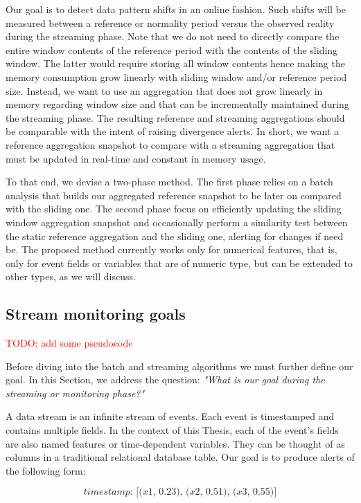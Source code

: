 Our goal is to detect data pattern shifts in an online fashion. Such shifts will be measured between a reference or normality period versus the observed reality during the streaming phase. Note that we do not need to directly compare the entire window contents of the reference period with the contents of the sliding window. The latter would require storing all window contents hence making the memory consumption grow linearly with sliding window and/or reference period size. Instead, we want to use an aggregation that does not grow linearly in memory regarding window size and that can be incrementally maintained during the streaming phase. The resulting reference and streaming aggregations should be comparable with the intent of raising divergence alerts. In short, we want a reference aggregation snapshot to compare with a streaming aggregation that must be updated in real-time and constant in memory usage.

To that end, we devise a two-phase method. The first phase relies on a batch analysis that builds our aggregated reference snapshot to be later on compared with the sliding one. The second phase focus on efficiently updating the sliding window aggregation snapshot and occasionally perform a similarity test between the static reference aggregation and the sliding one, alerting for changes if need be. The proposed method currently works only for numerical features, that is, only for event fields or variables that are of numeric type, but can be extended to other types, as we will discuss.

\subsection{Stream monitoring goals}
\textcolor{red}{TODO: add some pseudocode}

Before diving into the batch and streaming algorithms we must further define our goal. In this Section, we address the question: \textit{"What is our goal during the streaming or monitoring phase?"}

A data stream is an infinite stream of events. Each event is timestamped and contains multiple fields. In the context of this Thesis, each of the event's fields are also named features or time-dependent variables. They can be thought of as columns in a traditional relational database table. Our goal is to produce alerts of the following form:

\[\textit{timestamp: [(x1, 0.23), (x2, 0.51), (x3, 0.55)}]\]

